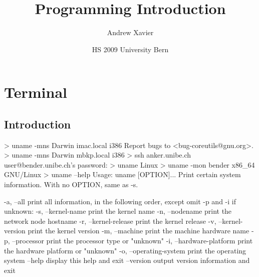 \documentclass[10pt,a4paper]{scrartcl}
\date{HS 2009 University Bern}
\author{Andrew Xavier}
\title{Programming Introduction}
\begin{document}
\maketitle

\tableofcontents

\newpage

\section{Terminal}
\subsection{Introduction}

\begin{terminalcode}
> uname -mns
  Darwin imac.local i386
  Report bugs to <bug-coreutils@gnu.org>.
> uname -mns
  Darwin mbkp.local i386
> ssh anker.unibe.ch
  user@bender.unibe.ch's password: 
> uname
  Linux
> uname -mon
  bender x86_64 GNU/Linux
> uname --help
  Usage: uname [OPTION]...
  Print certain system information.  With no OPTION, same as -s.
  
    -a, --all                print all information, in the following order,
                               except omit -p and -i if unknown:
    -s, --kernel-name        print the kernel name
    -n, --nodename           print the network node hostname
    -r, --kernel-release     print the kernel release
    -v, --kernel-version     print the kernel version
    -m, --machine            print the machine hardware name
    -p, --processor          print the processor type or "unknown"
    -i, --hardware-platform  print the hardware platform or "unknown"
    -o, --operating-system   print the operating system
        --help     display this help and exit
        --version  output version information and exit
\end{terminalcode}
\end{document}
